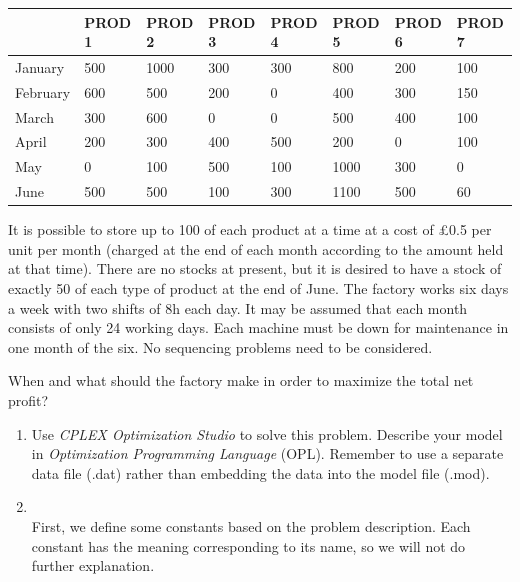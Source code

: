\documentclass[12pt,a4paper]{article}
\makeatletter
\newtheorem*{solution}{Solution}
\theoremstyle{definition}
\renewenvironment{solution}[1][Solution] {\par\pushQED{\qed}\normalfont\topsep6\p@\@plus6\p@\relax\trivlist\item[\hskip\labelsep\bfseries#1\@addpunct{.}]\ignorespaces}{\popQED\endtrivlist\@endpefalse} \makeatother
\makeatother
\begin{document}
\begin{enumerate}
    \begin{table}[htbp]
      \scriptsize
      \centering
      \renewcommand\arraystretch{1.1}
      \begin{tabular}{m{} m{}<{\centering} m{}<{\centering} m{}<{\centering} m{}<{\centering} m{}<{\centering} m{}<{\centering} m{}<{\centering}}
      \hline
       & \textbf{PROD 1} & \textbf{PROD 2} & \textbf{PROD 3} & \textbf{PROD 4} & \textbf{PROD 5} & \textbf{PROD 6} &  \textbf{PROD 7} \\\hline
      January & 500 & 1000 & 300 & 300 & 800 & 200 & 100 \\
      February & 600 & 500 & 200 & 0 & 400 & 300 & 150 \\
      March & 300 & 600 & 0 & 0 & 500 & 400 & 100 \\
      April & 200 & 300 & 400 & 500 & 200 & 0 & 100 \\
      May & 0 & 100 & 500 & 100 & 1000 & 300 & 0 \\
      June & 500 & 500 & 100 & 300 & 1100 & 500 & 60 \\
      \hline
      \end{tabular}
    \end{table}

    It is possible to store up to 100 of each product at a time at a cost of \pounds0.5 per unit per month (charged at the end of each month according to the amount held at that time). There are no stocks at present, but it is desired to have a stock of exactly 50 of each type of product at the end of June. The factory works six days a week with two shifts of 8h each day. It may be assumed that each month consists of only 24 working days. Each machine must be down for maintenance in one month of the six. No sequencing problems need to be considered.

    When and what should the factory make in order to maximize the total net profit?

    \begin{enumerate}
    \item
    Use \emph{CPLEX Optimization Studio} to solve this problem. Describe your model in \emph{Optimization Programming Language} (OPL). Remember to use a separate data file (.dat) rather than embedding the data into the model file (.mod).
    \begin{solution}
    ~\\
    First, we define some constants based on the problem description. Each constant has the meaning corresponding to its name, so we will not do further explanation. 
    

\end{solution}
\end{enumerate}
\end{enumerate}
\end{document}
